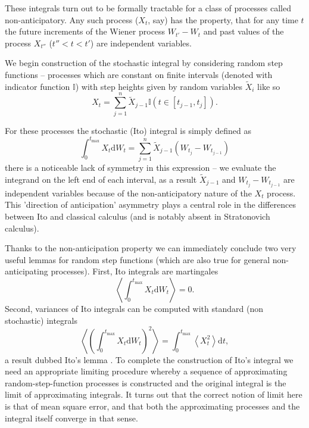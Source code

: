 \documentclass{doctoral}
\newcommand{\dd}{\mathrm{d}}
\begin{document}
These integrals turn out to be formally tractable for a class of processes called non-anticipatory.
Any such process ($X_t$, say) has the property, that for any time $t$ the future increments of the Wiener process $W_{t'} - W_t$ and past values of the process $X_{t''}$ ($t'' < t < t'$) are independent variables.

We begin construction of the stochastic integral by considering random step functions -- processes which are constant on finite intervals (denoted with indicator function $\mathbb{I}$) with step heights given by random variables $\widetilde{X}_{i}$ like so
\begin{equation}
    X_t = \sum_{j=1}^{n} \widetilde{X}_{j-1} \mathbb{I}(t \in [t_{j-1},t_j]).
    \label{eqn:random-step-function}
\end{equation}

For these processes the stochastic (Ito) integral is simply defined as
\begin{equation}
    \int_0^{t_{\mathrm{max}}} X_t \dd W_t = \sum_{j=1}^{n} \widetilde{X}_{j-1} (W_{t_j} - W_{t_{j-1}}) \label{eqn:ito-integral-step-function}
\end{equation}
there is a noticeable lack of symmetry in this expression -- we evaluate the integrand on the left end of each interval, as a result $\widetilde{X}_{j-1}$ and $W_{t_j} - W_{t_{j-1}}$ are independent variables because of the non-anticipatory nature of the $X_t$ process.
This 'direction of anticipation' asymmetry plays a central role in the differences between Ito and classical calculus (and is notably absent in Stratonovich calculus).

Thanks to the non-anticipation property we can immediately conclude two very useful lemmas for random step functions (which are also true for general non-anticipating processes).
First, Ito integrals are martingales
\begin{equation}
    \left< \int_0^{t_{\mathrm{max}}} X_t \dd W_t \right> = 0.
    \label{eqn:ito-integrals-are-martingales}
\end{equation}
Second, variances of Ito integrals can be computed with standard (non stochastic) integrals
\begin{equation}
    \left< \left( \int_0^{t_{\mathrm{max}}} X_t \dd W_t \right)^2 \right> = \int_{0}^{t_{\mathrm{max}}} \left< X_t^2 \right> \dd t, \label{eqn:itos-lemma}
\end{equation}
a result dubbed Ito's lemma \cite{Ito_1951}.
To complete the construction of Ito's integral we need an appropriate limiting procedure whereby a sequence of approximating random-step-function processes is constructed and the original integral is the limit of approximating integrals.
It turns out that the correct notion of limit here is that of mean square error, and that both the approximating processes and the integral itself converge in that sense.
\end{document}
